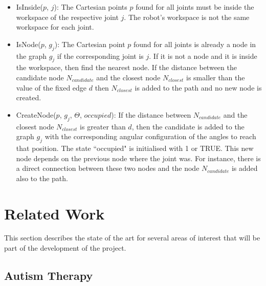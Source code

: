 \documentclass[thesis]{mas_proposal}
\begin{document}
\begin{itemize}
	\begin{itemize}
		
		\item IsInside($p$, $j$): The Cartesian points $p$ found for all joints must be inside the workspace of the respective joint $j$. The robot's workspace is not the same workspace for each joint.
		\item IsNode($p$, $g_j$): The Cartesian point $p$ found for all joints is already a node in the graph $g_j$ if the corresponding joint is $j$. If it is not a node and it is inside the workspace, then find the nearest node. If the distance between the candidate node $N_{candidate}$ and the closest node $N_{closest}$ is smaller than the value of the fixed edge $d$ then $N_{closest}$ is added to the path and no new node is created.
		\item CreateNode($p$, $g_j$, $\Theta$, $occupied$): If the distance between $N_{candidate}$ and the closest node $N_{closest}$ is greater than $d$, then the candidate is added to the graph $g_j$ with the corresponding angular configuration of the angles to reach that position. The state ``occupied" is initialised with 1 or TRUE. This new node depends on the previous node where the joint was. For instance, there is a direct connection between these two nodes and the node $N_{candidate}$ is added also to the path.
		
	\end{itemize} 
\end{itemize} 

\section{Related Work}
    
    This section describes the state of the art for several areas of interest that will be part of the development of the project.
    
    \subsection{Autism Therapy}
    
\end{document}
